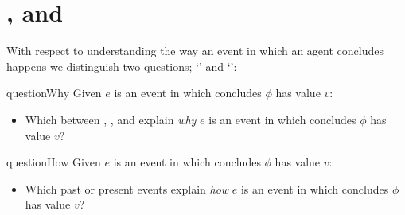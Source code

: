 \section*{\qWhy{}, \qHow{} and \issueInclusion{}}
\label{cha:intro:why-how}

\begin{note}
  With respect to understanding the way an event in which an agent concludes happens we distinguish two questions; `\qWhy{}' and `\qHow{}':

  \begin{question}{questionWhy}{\qWhy{}}
    Given \(e\) is an event in which \vAgent{} concludes \(\phi\) has value \(v\):
    \begin{itemize}
    \item
      Which \ros{} between , , and  explain \emph{why} \(e\) is an event in which \vAgent{} concludes \(\phi\) has value \(v\)?
    \end{itemize}
    \vspace{-1.5\baselineskip}
  \end{question}

  \begin{question}{questionHow}{\qHow{}}
    \label{q:how}
    Given \(e\) is an event in which \vAgent{} concludes \(\phi\) has value \(v\):
    \begin{itemize}
    \item
      Which past or present events explain \emph{how} \(e\) is an event in which \vAgent{} concludes \(\phi\) has value \(v\)?
    \end{itemize}
    \vspace{-1.5\baselineskip}
  \end{question}
\end{note}

